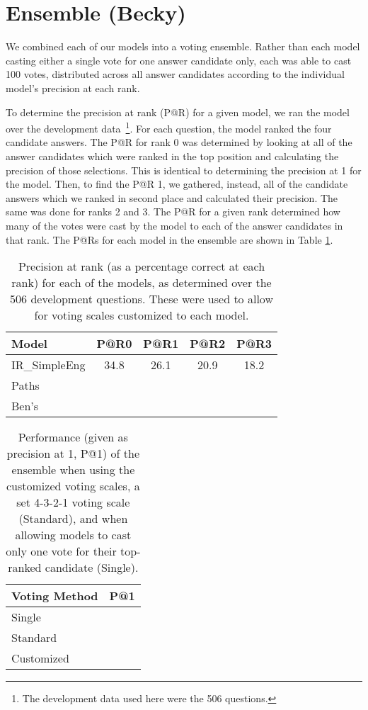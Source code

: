 \section{Ensemble (Becky)}
\label{sec:ensemble}

We combined each of our models into a voting ensemble.  Rather than each model casting either a single vote for one answer candidate only, each was able to cast 100 votes, distributed across all answer candidates according to the individual model's precision at each rank.

To determine the precision at rank (P@R) for a given model, we ran the model over the development data~\footnote{The development data used here were the 506 questions.}.  For each question, the model ranked the four candidate answers.  The P@R for rank 0 was determined by looking at all of the answer candidates which were ranked in the top position and calculating the precision of those selections.  This is identical to determining the precision at 1 for the model.  Then, to find the P@R 1, we gathered, instead, all of the candidate answers which we ranked in second place and calculated their precision.  The same was done for ranks 2 and 3.  The P@R for a given rank determined how many of the votes were cast by the model to each of the answer candidates in that rank.  The P@Rs for each model in the ensemble are shown in Table \ref{tab:p@r}.

\begin{table}[H]
\caption{Precision at rank (as a percentage correct at each rank) for each of the models, as determined over the 506 development questions.  These were used to allow for voting scales customized to each model.}
\begin{center}
\begin{tabular}{lcccc}
Model & P@R0 & P@R1 & P@R2 & P@R3\\
\hline
IR\_SimpleEng & 34.8 & 26.1 & 20.9 & 18.2 \\
Paths &  &  &  &  \\
Ben's &  &  &  &  \\

\end{tabular}
\end{center}
\label{tab:p@r}
\end{table}%

\begin{table}[H]
\caption{Performance (given as precision at 1, P@1) of the ensemble when using the customized voting scales, a set 4-3-2-1 voting scale (Standard), and when allowing models to cast only one vote for their top-ranked candidate (Single).}
\begin{center}
\begin{tabular}{lc}
Voting Method & P@1 \\
\hline
Single 		& 	\\
Standard 	&   \\
Customized 	&  	\\

\end{tabular}
\end{center}
\label{tab:ensemblemethods}
\end{table}%
	
